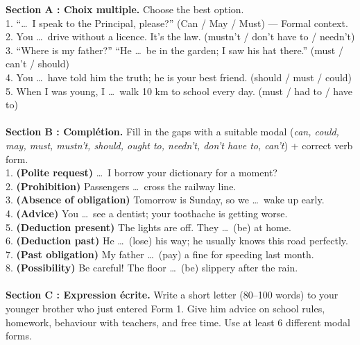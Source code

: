 \documentclass[11pt]{article}
\begin{document}
\begin{exercice}
\textbf{Section A : Choix multiple.} Choose the best option.\\
1. “\ldots\ I speak to the Principal, please?” (Can / May / Must) — Formal context.\\
2. You \ldots\ drive without a licence. It's the law. (mustn't / don't have to / needn't)\\
3. “Where is my father?” “He \ldots\ be in the garden; I saw his hat there.” (must / can't / should)\\
4. You \ldots\ have told him the truth; he is your best friend. (should / must / could)\\
5. When I was young, I \ldots\ walk 10 km to school every day. (must / had to / have to)\\
\\
\textbf{Section B : Complétion.} Fill in the gaps with a suitable modal (\emph{can, could, may, must, mustn't, should, ought to, needn't, don't have to, can't}) + correct verb form.\\
1. \textbf{(Polite request)} \ldots\ I borrow your dictionary for a moment?\\
2. \textbf{(Prohibition)} Passengers \ldots\ cross the railway line.\\
3. \textbf{(Absence of obligation)} Tomorrow is Sunday, so we \ldots\ wake up early.\\
4. \textbf{(Advice)} You \ldots\ see a dentist; your toothache is getting worse.\\
5. \textbf{(Deduction present)} The lights are off. They \ldots\ (be) at home.\\
6. \textbf{(Deduction past)} He \ldots\ (lose) his way; he usually knows this road perfectly.\\
7. \textbf{(Past obligation)} My father \ldots\ (pay) a fine for speeding last month.\\
8. \textbf{(Possibility)} Be careful! The floor \ldots\ (be) slippery after the rain.\\
\\
\textbf{Section C : Expression écrite.} Write a short letter (80--100 words) to your younger brother who just entered Form 1. Give him advice on school rules, homework, behaviour with teachers, and free time. Use at least 6 different modal forms.
\end{exercice}
\end{document}
